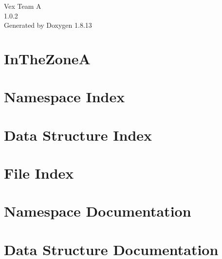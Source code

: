 \documentclass[twoside]{book}
\newcommand{\+}{\discretionary{\mbox{\scriptsize$\hookleftarrow$}}{}{}}
\newcommand{\clearemptydoublepage}{%
  \newpage{\pagestyle{empty}\cleardoublepage}%
}
\begin{document}
\begin{titlepage}
\vspace*{7cm}
\begin{center}%
{\Large Vex Team A \\[1ex]\large 1.\+0.\+2 }\\
\vspace*{1cm}
{\large Generated by Doxygen 1.8.13}\\
\end{center}
\end{titlepage}
\clearemptydoublepage
{}
\tableofcontents
\clearemptydoublepage
{}

\chapter{In\+The\+ZoneA}
\label{md__r_e_a_d_m_e}

\chapter{Namespace Index}

\chapter{Data Structure Index}

\chapter{File Index}

\chapter{Namespace Documentation}

\chapter{Data Structure Documentation}








\end{document}
